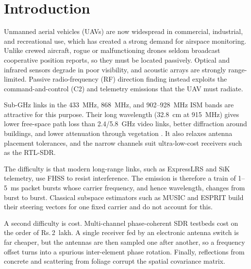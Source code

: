 \documentclass[conference]{IEEEtran}
\begin{document}
\section{Introduction}\label{sec:intro}
Unmanned aerial vehicles (UAVs) are now widespread in commercial, industrial, and recreational use, which has created a strong demand for airspace monitoring. Unlike crewed aircraft, rogue or malfunctioning drones seldom broadcast cooperative position reports, so they must be located passively. Optical and infrared sensors degrade in poor visibility, and acoustic arrays are strongly range-limited. Passive radio-frequency (RF) direction finding instead exploits the command-and-control (C2) and telemetry emissions that the UAV must radiate.

Sub-GHz links in the 433~MHz, 868~MHz, and 902--928~MHz ISM bands are attractive for this purpose. Their long wavelength (32.8~cm at 915~MHz) gives lower free-space path loss than 2.4/5.8~GHz video links, better diffraction around buildings, and lower attenuation through vegetation \cite{itu833}. It also relaxes antenna placement tolerances, and the narrow channels suit ultra-low-cost receivers such as the RTL-SDR.

The difficulty is that modern long-range links, such as ExpressLRS \cite{elrs} and SiK telemetry, use FHSS to resist interference. The emission is therefore a train of 1--5~ms packet bursts whose carrier frequency, and hence wavelength, changes from burst to burst. Classical subspace estimators such as MUSIC \cite{schmidt} and ESPRIT \cite{roy} build their steering vectors for one fixed carrier and do not account for this.

A second difficulty is cost. Multi-channel phase-coherent SDR testbeds cost on the order of \mbox{Rs.\,2~lakh}. A single receiver fed by an electronic antenna switch is far cheaper, but the antennas are then sampled one after another, so a frequency offset turns into a spurious inter-element phase rotation. Finally, reflections from concrete and scattering from foliage corrupt the spatial covariance matrix.
\end{document}
